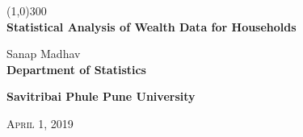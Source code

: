 \documentclass[a4paper,twoside,12pt]{article}
\begin{document}
\begin{titlepage}
\pagestyle{empty} %
\begin{center}
\line(1,0){300} \\
[0.25in]

\huge \textbf{Statistical Analysis of Wealth Data for Households }\\
[1.5cm]
\end{center}

\begin{center}
   \large Sanap Madhav \\
	\large \textbf{Department of Statistics}

\large \textbf{Savitribai Phule Pune University}


\vspace{1.5cm}
\textsc{\normalsize \large April 1, 2019}
\end{center}
\end{titlepage}

\tableofcontents %
\cleardoublepage %
\pagestyle{plain} %
\end{document}
